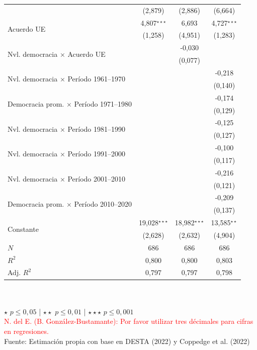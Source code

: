 \documentclass[a4paper]{tufte-handout}
\begin{document}
\begin{table}[h!]
\begin{tabular}{l c c c}
    & {\scriptsize (2,879)} & {\scriptsize (2,886)} & {\scriptsize (6,664)}\\
    \multirow{2}{*}{Acuerdo UE} & 4,807$^{\star\star\star}$ & 6,693 & 4,727$^{\star\star\star}$ \\
    & {\scriptsize (1,258)} & {\scriptsize (4,951)} & {\scriptsize (1,283)}\\
    \multirow{2}{*}{Nvl. democracia $\times$ Acuerdo UE} & & -0,030 & \\
    & & {\scriptsize (0,077)} & \\
    \multirow{2}{*}{Nvl. democracia $\times$ Período 1961--1970} & & & -0,218 \\
    & & & {\scriptsize (0,140)}\\
    \multirow{2}{*}{Democracia prom. $\times$ Período 1971--1980} & & & -0,174 \\
    & & & {\scriptsize (0,129)}\\
    \multirow{2}{*}{Nvl. democracia $\times$ Período 1981--1990} & & & -0,125 \\
    & & & {\scriptsize (0,127)}\\
    \multirow{2}{*}{Nvl. democracia $\times$ Período 1991--2000} & & & -0,100 \\
    & & & {\scriptsize (0,117)}\\
    \multirow{2}{*}{Nvl. democracia $\times$ Período 2001--2010} & & & -0,216 \\
    & & & {\scriptsize (0,121)}\\
    \multirow{2}{*}{Democracia prom. $\times$ Período 2010--2020} & & & -0,209 \\
    & & & {\scriptsize (0,137)}\\
    \multirow{2}{*}{Constante} & 19,028$^{\star\star\star}$ & 18,982$^{\star\star\star}$ & 13,585$^{\star\star}$  \\
    & {\scriptsize (2,628)} & {\scriptsize (2,632)} & {\scriptsize (4,904)} \\ \midrule
    $N$ & 686 & 686 & 686 \\ \midrule
    $R^2$ & 0,800 & 0,800 & 0,803 \\
    Adj. $R^2$ & 0,797 & 0,797 & 0,798 \\ \bottomrule
  \end{tabular}
  \\~\\ \smallskip\noindent\scriptsize $\star$ $p \leq 0,05$ | $\star\star$ $p \leq 0,01$ | $\star\star\star$ $p \leq 0,001$  \\ \textcolor{red}{N. del E. (B. González-Bustamante): Por favor utilizar tres décimales para cifras en regresiones.} \\ Fuente: Estimación propia con base en DESTA (2022) y Coppedge et al. (2022)
\end{table}
\pagebreak
\end{document}
